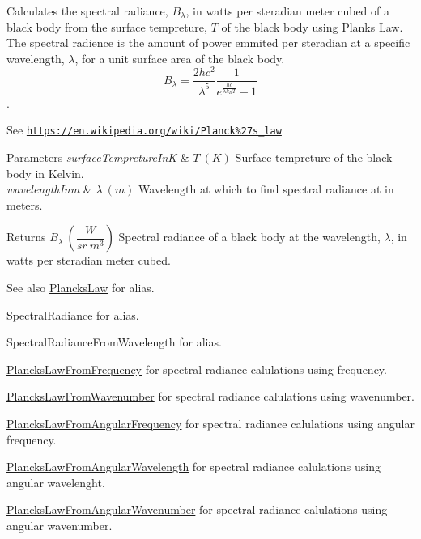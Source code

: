 Calculates the spectral radiance, $B_{\lambda}$, in watts per steradian meter cubed of a black body from the surface tempreture, $T$ of the black body using Plank\textquotesingle{}s Law. The spectral radience is the amount of power emmited per steradian at a specific wavelength, $\lambda$, for a unit surface area of the black body. \[ B_{\lambda} = \dfrac{2 h c^2}{\lambda^5} \dfrac{1}{e^{\frac{hc}{\lambda k_B T}} - 1} \]. 

See \href{https://en.wikipedia.org/wiki/Planck%27s_law}{\tt https\+://en.\+wikipedia.\+org/wiki/\+Planck\%27s\+\_\+law}


\begin{DoxyParams}{Parameters}
{\em surface\+Tempreture\+InK} & $T\ (K)$ Surface tempreture of the black body in Kelvin. \\
\hline
{\em wavelength\+Inm} & $\lambda\ (m)$ Wavelength at which to find spectral radiance at in meters. \\
\hline
\end{DoxyParams}
\begin{DoxyReturn}{Returns}
$B_{\lambda}\ ( \dfrac{W}{sr\ m^3})$ Spectral radiance of a black body at the wavelength, $\lambda$, in watts per steradian meter cubed. 
\end{DoxyReturn}
\begin{DoxySeeAlso}{See also}
\mbox{\hyperlink{group___e_g_x_phys-_electrodynamics-_black_body-_plancks_law_ga44d8dc3e072ffc7d860cd8f07463f091}{Plancks\+Law}} for alias. 

Spectral\+Radiance for alias. 

Spectral\+Radiance\+From\+Wavelength for alias. 

\mbox{\hyperlink{group___e_g_x_phys-_electrodynamics-_black_body-_plancks_law_ga68aae82f8a086831358c4a61c8c80ba4}{Plancks\+Law\+From\+Frequency}} for spectral radiance calulations using frequency. 

\mbox{\hyperlink{group___e_g_x_phys-_electrodynamics-_black_body-_plancks_law_ga6648ae2a0fbff6735c1e1a04c7cac746}{Plancks\+Law\+From\+Wavenumber}} for spectral radiance calulations using wavenumber. 

\mbox{\hyperlink{group___e_g_x_phys-_electrodynamics-_black_body-_plancks_law_gaac540560c71e30c02b91d22e417b5863}{Plancks\+Law\+From\+Angular\+Frequency}} for spectral radiance calulations using angular frequency. 

\mbox{\hyperlink{group___e_g_x_phys-_electrodynamics-_black_body-_plancks_law_ga7322124727f968d28807e918c5eeb23f}{Plancks\+Law\+From\+Angular\+Wavelength}} for spectral radiance calulations using angular wavelenght. 

\mbox{\hyperlink{group___e_g_x_phys-_electrodynamics-_black_body-_plancks_law_gaa3d3e0fdb77d25bdd40523f9975de902}{Plancks\+Law\+From\+Angular\+Wavenumber}} for spectral radiance calulations using angular wavenumber. 
\end{DoxySeeAlso}
